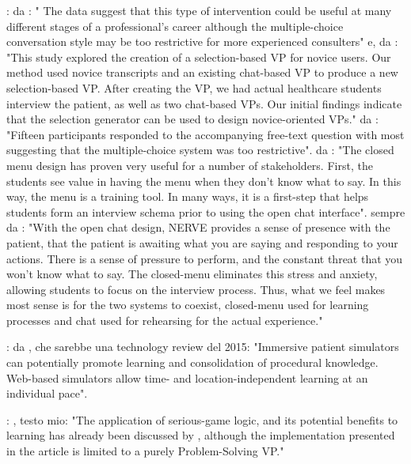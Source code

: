 : da \cite{jacklin2019virtual}: " The data suggest that this type of intervention  could be useful at many different stages of a professional’s career although the multiple-choice conversation style may be too restrictive for more experienced consulters" e, da \cite{carnell2015adapting}: "This study explored the creation of a selection-based VP for novice users. Our method used novice transcripts and an existing chat-based VP to produce a new selection-based VP. After creating the VP, we had actual healthcare students interview the patient, as well as two chat-based VPs. Our initial ﬁndings indicate that the selection generator can be used to design novice-oriented VPs." da \cite{jacklin2019virtual}: "Fifteen participants responded to the accompanying free-text question with most suggesting that the multiple-choice system was too restrictive". da \cite{hirumi2016advancing}: "The closed menu design has proven very useful for a number of stakeholders. First, the students see value in having the menu when they don’t know what to say. In this way, the menu is a training tool. In many ways, it is a first-step that helps students form an interview schema prior to using the open chat interface". sempre da \cite{hirumi2016advancing}: "With the open chat design, NERVE provides a sense of presence with
the patient, that the patient is awaiting what you are saying and responding to your actions.
There is a sense of pressure to perform, and the constant threat that you won’t know what
to say. The closed-menu eliminates this stress and anxiety, allowing students to focus on
the interview process. Thus, what we feel makes most sense is for the two systems to coexist, closed-menu used for learning processes and chat used for rehearsing for the actual
experience."

: da \cite{kleinert20153d}, che sarebbe una technology review del 2015: "Immersive patient simulators can potentially promote learning and consolidation of procedural knowledge. Web-based simulators allow time- and location-independent learning at an individual pace". \par

: \cite{tacheci2015virtual}, testo mio: "The application of serious-game logic, and its potential benefits to learning has already been discussed by \cite{tacheci2015virtual}, although the implementation presented in the article is limited to a purely Problem-Solving VP." \par

